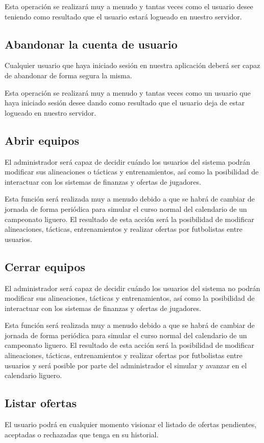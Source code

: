 Esta operación se realizará muy a menudo y tantas veces como el usuario desee
teniendo como resultado que el usuario estará logueado en nuestro servidor.
\subsection*{Abandonar la cuenta de usuario}
Cualquier usuario que haya iniciado sesión en nuestra aplicación deberá ser
capaz de abandonar de forma segura la misma.

Esta operación se realizará muy a menudo y tantas veces como un usuario que haya
iniciado sesión desee dando como resultado que el usuario deja de estar logueado
en nuestro servidor.
\subsection*{Abrir equipos}
El administrador será capaz de decidir cuándo los usuarios del sistema podrán
modificar sus alineaciones o tácticas y entrenamientos, así como la posibilidad de interactuar
con los sistemas de finanzas y ofertas de jugadores.

Esta función será realizada muy a menudo debido a que se habrá de cambiar de
jornada de forma periódica para simular el curso normal del calendario de un
campeonato liguero. El resultado de esta acción será la posibilidad de modificar
alineaciones, tácticas, entrenamientos y realizar ofertas por futbolistas entre usuarios.
\subsection*{Cerrar equipos}
El administrador será capaz de decidir cuándo los usuarios del sistema no podrán
modificar sus alineaciones, tácticas y entrenamientos, así como la posibilidad de interactuar
con los sistemas de finanzas y ofertas de jugadores.

Esta función será realizada muy a menudo debido a que se habrá de cambiar de
jornada de forma periódica para simular el curso normal del calendario de un
campeonato liguero. El resultado de esta acción será la posibilidad de modificar
alineaciones, tácticas, entrenamientos y realizar ofertas por futbolistas entre
usuarios y será posible por parte del administrador el simular y avanzar en el
calendario liguero.

\subsection*{Listar ofertas}
El usuario podrá en cualquier momento visionar el listado de ofertas pendientes,
aceptadas o rechazadas que tenga en su historial.

